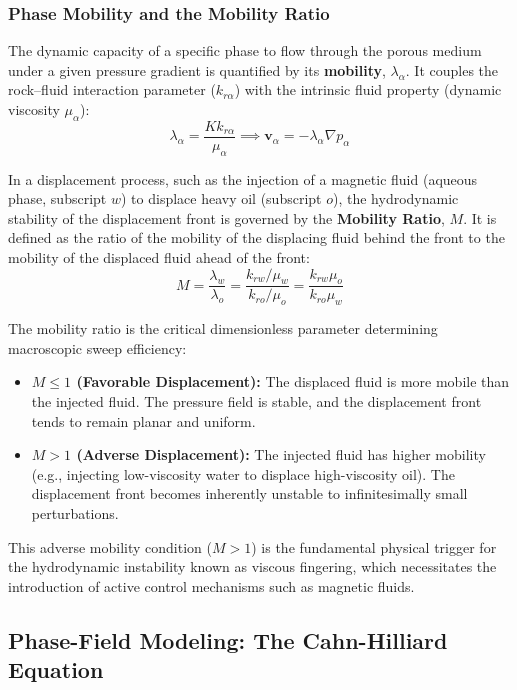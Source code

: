 \subsubsection{Phase Mobility and the Mobility Ratio}

The dynamic capacity of a specific phase to flow through the porous medium under a given pressure gradient is quantified by its \textbf{mobility}, $\lambda_\alpha$.
It couples the rock--fluid interaction parameter ($k_{r\alpha}$) with the intrinsic fluid property (dynamic viscosity $\mu_\alpha$):
\begin{equation}
    \lambda_\alpha = \frac{K k_{r\alpha}}{\mu_\alpha} \implies \mathbf{v}_\alpha = -\lambda_\alpha \nabla p_\alpha
\end{equation}

In a displacement process, such as the injection of a magnetic fluid (aqueous phase, subscript $w$) to displace heavy oil (subscript $o$), the hydrodynamic stability of the displacement front is governed by the \textbf{Mobility Ratio}, $M$.
It is defined as the ratio of the mobility of the displacing fluid behind the front to the mobility of the displaced fluid ahead of the front:
\begin{equation}
    M = \frac{\lambda_w}{\lambda_o} = \frac{k_{rw} / \mu_w}{k_{ro} / \mu_o} = \frac{k_{rw} \mu_o}{k_{ro} \mu_w}
\end{equation}

The mobility ratio is the critical dimensionless parameter determining macroscopic sweep efficiency:
\begin{itemize}
    \item \textbf{$M \leq 1$ (Favorable Displacement):} The displaced fluid is more mobile than the injected fluid.
    The pressure field is stable, and the displacement front tends to remain planar and uniform.
    \item \textbf{$M > 1$ (Adverse Displacement):} The injected fluid has higher mobility (e.g., injecting low-viscosity water to displace high-viscosity oil).
    The displacement front becomes inherently unstable to infinitesimally small perturbations.
\end{itemize}

This adverse mobility condition ($M>1$) is the fundamental physical trigger for the hydrodynamic instability known as viscous fingering, which necessitates the introduction of active control mechanisms such as magnetic fluids.

\subsection{Phase-Field Modeling: The Cahn-Hilliard Equation}

